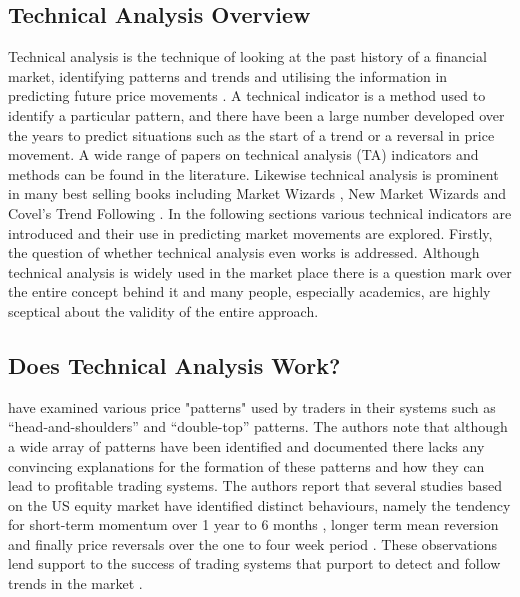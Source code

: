 \subsection{Technical Analysis Overview}
Technical analysis is the technique of looking at the past history of a financial market, identifying patterns and trends and utilising the information in predicting future price movements \citep{bulkowski2011encyclopedia}. A technical indicator is a method used to identify a particular pattern, and there have been a large number developed over the years to predict situations such as the start of a trend or a reversal in price movement.  A wide range of papers on technical analysis (TA) indicators and methods can be found in the literature. Likewise technical analysis is prominent in many best selling books including Market Wizards \citep{schwager2012market}, New Market Wizards \citep{schwager2012new} and Covel's Trend Following \citep{covel2009trend}. In the following sections various technical indicators are introduced and their use in predicting market movements are explored. Firstly, the question of whether technical analysis even works is addressed.  Although technical analysis is widely used in the market place there is a question mark over the entire concept behind it and many people, especially academics, are highly sceptical about the validity of the entire approach.

\subsection{Does Technical Analysis Work?}

\cite{Friesen20091089} have examined various price "patterns" used by traders in their systems such as \textquotedblleft head-and-shoulders” and \textquotedblleft double-top” patterns. The authors note that although a wide array of patterns have been identified and documented there lacks any convincing explanations for the formation of these patterns and how they can lead to profitable trading systems.  The authors report that several studies based on the US equity market have identified distinct behaviours, namely the tendency for short-term momentum over 1 year to 6 months \citep{Bondt,chopra1992,jegadeesh1993}, longer term mean reversion and finally price reversals over the one to four week period \citep{jegadeesh1990,lehmann1990,jegadeesh1995,kelley2008}. These observations lend support to the success of trading systems that purport to detect and follow trends in the market \citep{sweeney182,levich1993,neely1997,Dueker2007}.

